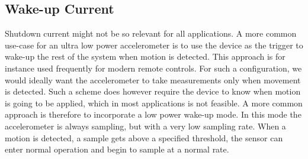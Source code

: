 
\subsection{Wake-up Current}

Shutdown current might not be so relevant for all applications. A more common use-case for an ultra low power accelerometer is to use the device as the trigger to wake-up the rest of the system when motion is detected. This approach is for instance used frequently for modern remote controls. For such a configuration, we would ideally want the accelerometer to take measurements only when movement is detected. Such a scheme does however require the device to know when motion is going to be applied, which in most applications is not feasible. A more common approach is therefore to incorporate a low power wake-up mode. In this mode the accelerometer is always sampling, but with a very low sampling rate. When a motion is detected, a sample gets above a specified threshold, the sensor can enter normal operation and begin to sample at a normal rate. 

